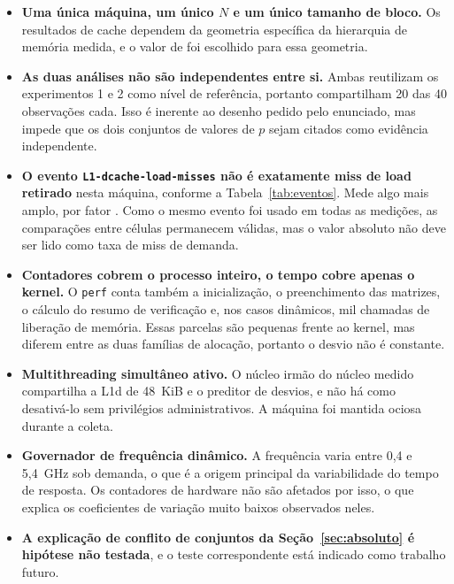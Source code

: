 \documentclass[11pt,a4paper]{article}
\begin{document}
\begin{itemize}
  \item \textbf{Uma única máquina, um único $N$ e um único tamanho de bloco.} Os
  resultados de cache dependem da geometria específica da hierarquia de memória medida, e
  o valor de \valBloco{} foi escolhido para essa geometria.

  \item \textbf{As duas análises não são independentes entre si.} Ambas reutilizam os
  experimentos 1 e 2 como nível de referência, portanto compartilham 20 das 40
  observações cada. Isso é inerente ao desenho pedido pelo enunciado, mas impede que os
  dois conjuntos de valores de $p$ sejam citados como evidência independente.

  \item \textbf{O evento \texttt{L1-dcache-load-misses} não é exatamente miss de load
  retirado} nesta máquina, conforme a Tabela~\ref{tab:eventos}. Mede algo mais amplo, por
  fator \valRazaoEvMisses. Como o mesmo evento foi usado em todas as medições, as
  comparações entre células permanecem válidas, mas o valor absoluto não deve ser lido
  como taxa de miss de demanda.

  \item \textbf{Contadores cobrem o processo inteiro, o tempo cobre apenas o kernel.} O
  \texttt{perf} conta também a inicialização, o preenchimento das matrizes, o cálculo do
  resumo de verificação e, nos casos dinâmicos, mil chamadas de liberação de memória.
  Essas parcelas são pequenas frente ao kernel, mas diferem entre as duas famílias de
  alocação, portanto o desvio não é constante.

  \item \textbf{Multithreading simultâneo ativo.} O núcleo irmão do núcleo medido
  compartilha a L1d de 48~KiB e o preditor de desvios, e não há como desativá-lo sem
  privilégios administrativos. A máquina foi mantida ociosa durante a coleta.

  \item \textbf{Governador de frequência dinâmico.} A frequência varia entre 0,4 e
  5,4~GHz sob demanda, o que é a origem principal da variabilidade do tempo de resposta.
  Os contadores de hardware não são afetados por isso, o que explica os coeficientes de
  variação muito baixos observados neles.

  \item \textbf{A explicação de conflito de conjuntos da Seção~\ref{sec:absoluto} é
  hipótese não testada}, e o teste correspondente está indicado como trabalho futuro.
\end{itemize}
\end{document}
